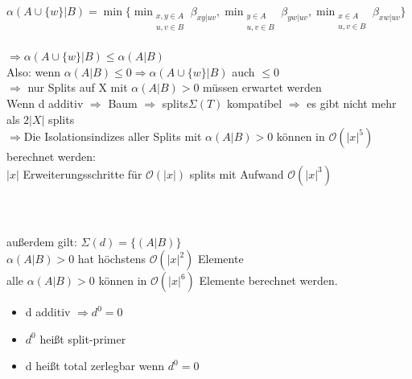 $\alpha(A\cup\{w\}|B)=\min \{ \displaystyle\min_{\substack{x,y \in A \\ u,v \in B}} \beta_{xy|uv}, \displaystyle\min_{\substack{y \in A \\ u,v \in B}} \beta_{yw|uv}, \displaystyle\min_{\substack{x \in A \\ u,v \in B}} \beta_{xw|uv} \}$
\\\\
$\Rightarrow \alpha(A \cup \{w\}|B) \leq \alpha(A|B)$\\
Also: wenn $\alpha(A|B) \leq 0 \Rightarrow \alpha(A \cup \{w\}|B)$ auch $\leq0$\\ 
$\Rightarrow$ nur Splits auf X mit $\alpha(A|B)>0$ müssen erwartet werden\\
Wenn d additiv $\Rightarrow$ Baum $\Rightarrow$ splits$\Sigma(T)$ kompatibel $\Rightarrow$ es gibt nicht mehr als $2|X|$ splits\\
$\Rightarrow$Die Isolationsindizes aller Splits mit $\alpha(A|B)>0$ können in $\mathcal{O}(|x|^5)$ berechnet werden:\\
$|x|$ Erweiterungsschritte für $\mathcal{O}(|x|)$ splits mit Aufwand $\mathcal{O}(|x|^3)$\\\\

\\\\
außerdem gilt: $\Sigma(d)=\{(A|B)\}$\\
$\alpha(A|B)>0$ hat höchstens $\mathcal{O}(|x|^2)$ Elemente\\
alle $\alpha(A|B)>0$ können in $\mathcal{O}(|x|^6)$ Elemente berechnet werden.\\
\begin{itemize}
	\item d additiv $\Rightarrow d^0=0$
	\item $d^0$ heißt split-primer
	\item d heißt total zerlegbar wenn $d^0=0$
\end{itemize}

